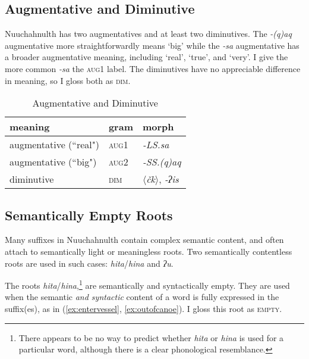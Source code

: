 \subsection{Augmentative and Diminutive}

Nuuchahnulth has two augmentatives and at least two diminutives. The \textit{-(q)aq} augmentative more straightforwardly means `big' while the \textit{-sa} augmentative has a broader augmentative meaning, including `real', `true', and `very'. I give the more common \textit{-sa} the \textsc{aug1} label. The diminutives have no appreciable difference in meaning, so I gloss both as \textsc{dim}.

\begin{table}[ht]
\centering
\caption{Augmentative and Diminutive}
\label{table:augdim}
\begin{tabular}{lll}
meaning                            & gram               & morph                                         \\ \hline
\multicolumn{1}{|l|}{augmentative (``real")} & \multicolumn{1}{l|}{\textsc{aug1}}   & \multicolumn{1}{l|}{\textit{-LS.sa}}                   \\ \hline
\multicolumn{1}{|l|}{augmentative (``big")} & \multicolumn{1}{l|}{\textsc{aug2}}   & \multicolumn{1}{l|}{\textit{-SS.(q)aq}}                   \\ \hline
\multicolumn{1}{|l|}{diminutive}   & \multicolumn{1}{l|}{\textsc{dim}} & \multicolumn{1}{l|}{\textit{$\langle$čk$\rangle$}, \textit{-ʔis}} \\ \hline
\end{tabular}
\end{table}

\subsection{Semantically Empty Roots} \label{sec:empty}

Many suffixes in Nuuchahnulth contain complex semantic content, and often attach to semantically light or meaningless roots. Two semantically contentless roots are used in such cases: \textit{hita}/\textit{hina} and \textit{ʔu}.

The roots \textit{hita}/\textit{hina},\footnote{There appears to be no way to predict whether \textit{hita} or \textit{hina} is used for a particular word, although there is a clear phonological resemblance.} are semantically and syntactically empty. They are used when the semantic \textit{and syntactic} content of a word is fully expressed in the suffix(es), as in (\ref{ex:entervessel}, \ref{ex:outofcanoe}). I gloss this root as \textsc{empty}.

